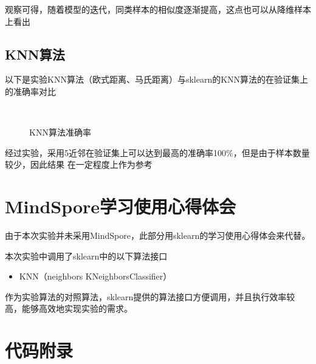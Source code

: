 \documentclass[notitlepage]{article}
\begin{document}
观察可得，随着模型的迭代，同类样本的相似度逐渐提高，这点也可以从降维样本上看出

\subsection*{KNN算法}

以下是实验KNN算法（欧式距离、马氏距离）与sklearn的KNN算法的在验证集上的准确率对比

\begin{figure}[htbp]
	\centering
	\\
	\caption{KNN算法准确率}
\end{figure}

经过实验，采用5近邻在验证集上可以达到最高的准确率100\%，但是由于样本数量较少，因此结果
在一定程度上作为参考

\section{MindSpore学习使用心得体会}

由于本次实验并未采用MindSpore，此部分用sklearn的学习使用心得体会来代替。

本次实验中调用了sklearn中的以下算法接口

\begin{itemize}
    \item KNN（neighbors KNeighborsClassifier）
\end{itemize}

作为实验算法的对照算法，sklearn提供的算法接口方便调用，并且执行效率较高，能够高效地实现实验的需求。

\section{代码附录}
\end{document}
